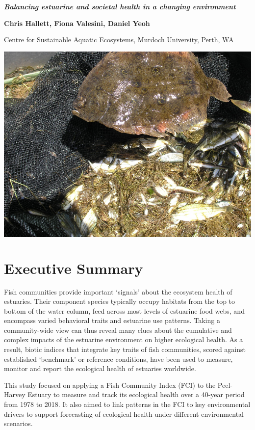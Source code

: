 \documentclass[
]{book}
\begin{document}
{\textbf{\emph{Balancing estuarine and societal health in a changing environment}}}

{\textbf{Chris Hallett, Fiona Valesini, Daniel Yeoh}}

{Centre for Sustainable Aquatic Ecosystems, Murdoch University, Perth, WA}

\includegraphics[width=1\linewidth]{images/fish_ecology/picture1}

\hypertarget{executive-summary-1}{%
\section{Executive Summary}\label{executive-summary-1}}

Fish communities provide important `signals' about the ecosystem health of estuaries. Their component species typically occupy habitats from the top to bottom of the water column, feed across most levels of estuarine food webs, and encompass varied behavioral traits and estuarine use patterns. Taking a community-wide view can thus reveal many clues about the cumulative and complex impacts of the estuarine environment on higher ecological health. As a result, biotic indices that integrate key traits of fish communities, scored against established `benchmark' or reference conditions, have been used to measure, monitor and report the ecological health of estuaries worldwide.~

This study focused on applying a Fish Community Index (FCI) to the Peel-Harvey Estuary to measure and track its ecological health over a 40-year period from 1978 to 2018. It also aimed to link patterns in the FCI to key environmental drivers to support forecasting of ecological health under different environmental scenarios.
\end{document}
